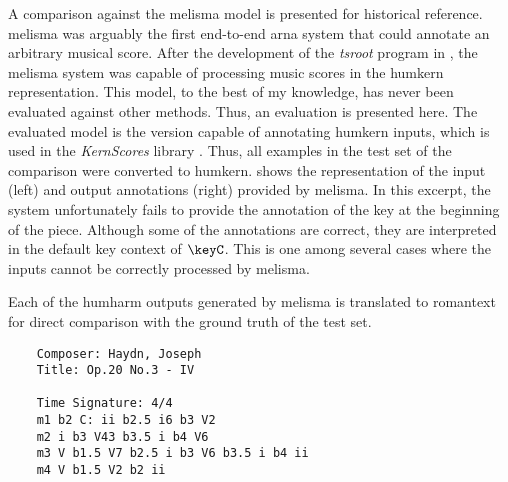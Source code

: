 
A comparison against the \gls{melisma} model is presented
for historical reference. \gls{melisma} was arguably the
first end-to-end \gls{arna} system that could annotate an
arbitrary musical score. After the development of the
\emph{tsroot} program in \textcite{sapp2009tsroot}, the
\gls{melisma} system was capable of processing music scores
in the \gls{humkern} representation. This model, to the best
of my knowledge, has never been evaluated against other
methods. Thus, an evaluation is presented here. The
evaluated model is the version capable of annotating
\gls{humkern} inputs, which is used in the \emph{KernScores}
library \parencite{sapp2005online}. Thus, all examples in
the test set of the comparison were converted to
\gls{humkern}.  shows the
representation of the input (left) and output annotations
(right) provided by \gls{melisma}. In this excerpt, the
system unfortunately fails to provide the annotation of the
key at the beginning of the piece. Although some of the
annotations are correct, they are interpreted in the default
key context of $\keyC$. This is one among several cases
where the inputs cannot be correctly processed by
\gls{melisma}.


Each of the \gls{humharm} outputs generated by \gls{melisma}
is translated to \gls{romantext} for direct comparison with
the ground truth of the test set. 

\begin{verbatim}
    Composer: Haydn, Joseph
    Title: Op.20 No.3 - IV
    
    Time Signature: 4/4
    m1 b2 C: ii b2.5 i6 b3 V2
    m2 i b3 V43 b3.5 i b4 V6
    m3 V b1.5 V7 b2.5 i b3 V6 b3.5 i b4 ii
    m4 V b1.5 V2 b2 ii
\end{verbatim}
